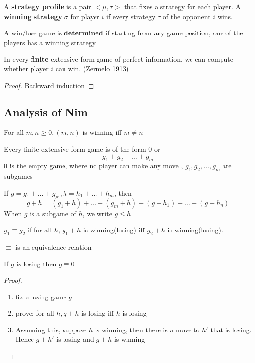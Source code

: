 \documentclass[11pt]{article}
\begin{document}
A \textbf{strategy profile} is a pair \(<\mu,\tau>\) that fixes a strategy for each
player. A \textbf{winning strategy} \(\sigma\) for player \(i\) if every strategy \(\tau\) of
the opponent \(i\) wins.


A win/lose game is \textbf{determined} if starting from any game position, one of the
players has a winning strategy


\begin{theorem}
In every \textbf{finite} extensive form game of perfect information, we can compute whether
player $i$ can win. (Zermelo 1913)
\end{theorem}
\begin{proof}
Backward induction
\end{proof}

\subsection{Analysis of Nim}
\label{sec:org5f4e385}
\begin{lemma}
For all $m,n\ge0, (m,n)$ is winning iff $m\neq n$
\end{lemma}

Every finite extensive form game is of the form \(0\) or
\begin{equation*}
g_1+g_2+\dots+g_m
\end{equation*}
0 is the empty game, where no player can make any move
, \(g_1,g_2,\dots,g_m\) are subgames


If \(g=g_1+\dots+g_m, h=h_1+\dots+h_m\), then
\begin{equation*}
g+h=(g_1+h)+\dots+(g_m+h)+(g+h_1)+\dots+(g+h_n)
\end{equation*}
When \(g\) is a subgame of \(h\), we write \(g\le h\)


\textbf{\(g_1\equiv g_2\)} if for all \(h\), \(g_1+h\) is winning(losing) iff \(g_2+h\) is
winning(losing).


\(\equiv\) is an equivalence relation


\begin{lemma}\leavevmode
If $g$ is losing then $g\equiv 0$
\end{lemma}

\begin{proof}
\;\par
\begin{enumerate}
\item fix a losing game $g$
\item prove: for all $h, g+h$ is losing iff $h$ is losing
\item Assuming this, suppose $h$ is winning, then there is a move to $h'$
that is losing. Hence $g+h'$ is losing and $g+h$ is winning
\end{enumerate}
\end{proof}
\end{document}
